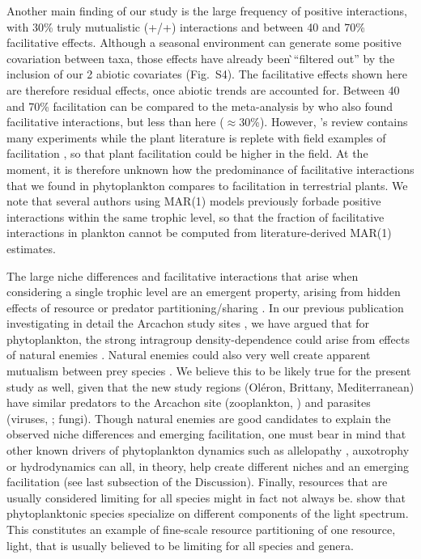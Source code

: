 \documentclass[10pt]{article}
\begin{document}
Another main finding of our study is the large frequency of positive
interactions, with 30\% truly mutualistic (+/+) interactions and between
40 and 70\% facilitative effects. Although a seasonal environment can generate some positive covariation between taxa, those effects have already been ̀``filtered out'' by the inclusion of our 2 abiotic covariates (Fig.~S4). The facilitative effects shown here are therefore residual effects, once abiotic trends are accounted for. Between 40 and 70\% facilitation can be compared to the
meta-analysis by \citet{adler_competition_2018} who also found facilitative
interactions, but less than here ($\approx$30\%). However, \citet{adler_competition_2018}'s
review contains many experiments while the plant literature is replete
with field examples of facilitation \citep{brooker_facilitation_2008,mcintire2014facilitation},
so that plant facilitation could be higher in the field. At the moment,
it is therefore unknown how the predominance of facilitative interactions
that we found in phytoplankton compares to facilitation in terrestrial
plants. We note that several authors using MAR(1) models previously
forbade positive interactions within the same trophic level, so that
the fraction of facilitative interactions in plankton cannot be computed
from literature-derived MAR(1) estimates.

The large niche differences and facilitative interactions that arise
when considering a single trophic level are an emergent property,
arising from hidden effects of resource or predator partitioning/sharing
\citep{chesson_updates_2018}. In our previous publication investigating
in detail the Arcachon study sites \citep{barraquand_coastal_2018},
we have argued that for phytoplankton, the strong intragroup density-dependence
could arise from effects of natural enemies \citep{haydon_pivotal_1994,barraquand_coastal_2018}.
Natural enemies could also very well create apparent mutualism between
prey species \citep{abrams_apparent_1998,barraquand_indirect_2015,de_ruiter_emergent_2017}.
We believe this to be likely true for the present study as well, given
that the new study regions (Oléron, Brittany, Mediterranean) have
similar predators to the Arcachon site (zooplankton, \citealp[e.g.,][]{jamet_zooplankton_2001,moderan_zooplankton_2010,tortajada_network_2012})
and parasites (viruses, \citealp[e.g.,][]{ory_pelagic_2010};
fungi). Though natural enemies are good candidates to explain the
observed niche differences and emerging facilitation, one must bear
in mind that other known drivers of phytoplankton dynamics such as
allelopathy \citep{felpeto_allelopathy_2018}, auxotrophy \citep{tang_most_2010}
or hydrodynamics \citep{levy_role_2018} can all, in theory, help
create different niches and an emerging facilitation (see last subsection
of the Discussion). Finally, resources that are usually considered
limiting for all species might in fact not always be. \citet{burson_competition_2018} show that phytoplanktonic species specialize on different components of the light spectrum. This constitutes an example of fine-scale resource partitioning of one resource,
light, that is usually believed to be limiting for all species and
genera.
\end{document}
